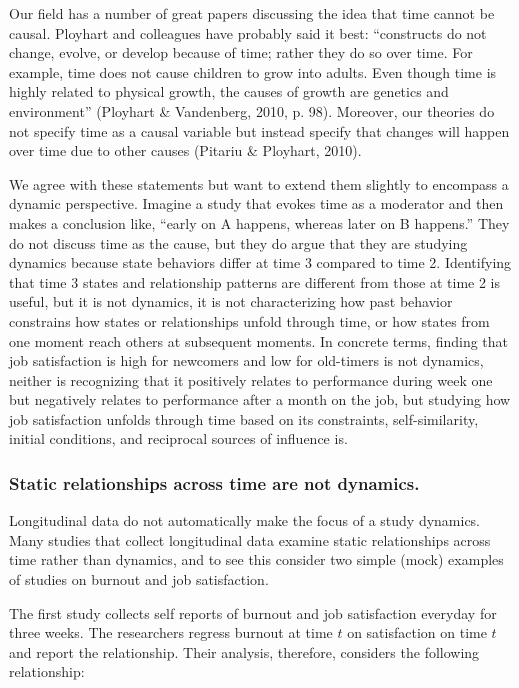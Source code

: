 \documentclass[english,,man]{apa6}
\theoremstyle{definition}
\theoremstyle{definition}
\theoremstyle{definition}
\theoremstyle{remark}
\begin{document}
Our field has a number of great papers discussing the idea that time
cannot be causal. Ployhart and colleagues have probably said it best:
\enquote{constructs do not change, evolve, or develop because of time;
rather they do so over time. For example, time does not cause children
to grow into adults. Even though time is highly related to physical
growth, the causes of growth are genetics and environment} (Ployhart \&
Vandenberg, 2010, p. 98). Moreover, our theories do not specify time as
a causal variable but instead specify that changes will happen over time
due to other causes (Pitariu \& Ployhart, 2010).

We agree with these statements but want to extend them slightly to
encompass a dynamic perspective. Imagine a study that evokes time as a
moderator and then makes a conclusion like, \enquote{early on A happens,
whereas later on B happens.} They do not discuss time as the cause, but
they do argue that they are studying dynamics because state behaviors
differ at time 3 compared to time 2. Identifying that time 3 states and
relationship patterns are different from those at time 2 is useful, but
it is not dynamics, it is not characterizing how past behavior
constrains how states or relationships unfold through time, or how
states from one moment reach others at subsequent moments. In concrete
terms, finding that job satisfaction is high for newcomers and low for
old-timers is not dynamics, neither is recognizing that it positively
relates to performance during week one but negatively relates to
performance after a month on the job, but studying how job satisfaction
unfolds through time based on its constraints, self-similarity, initial
conditions, and reciprocal sources of influence is.

\hypertarget{static-relationships-across-time-are-not-dynamics.}{%
\subsubsection{Static relationships across time are not
dynamics.}\label{static-relationships-across-time-are-not-dynamics.}}

Longitudinal data do not automatically make the focus of a study
dynamics. Many studies that collect longitudinal data examine static
relationships across time rather than dynamics, and to see this consider
two simple (mock) examples of studies on burnout and job satisfaction.

The first study collects self reports of burnout and job satisfaction
everyday for three weeks. The researchers regress burnout at time \(t\)
on satisfaction on time \(t\) and report the relationship. Their
analysis, therefore, considers the following relationship:
\end{document}
